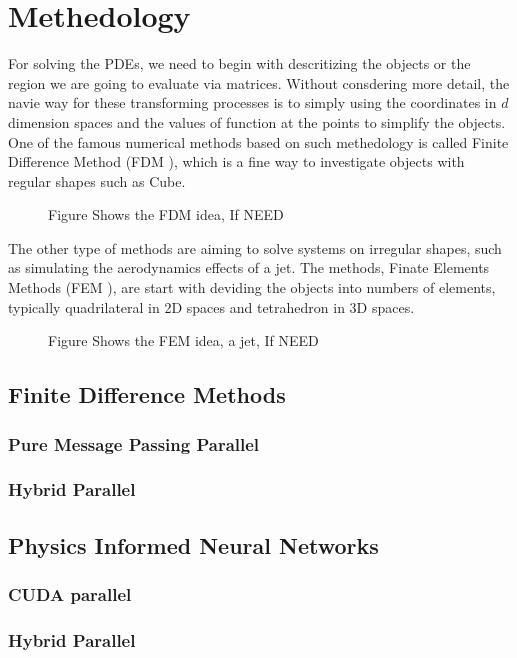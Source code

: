 \section{Methedology}
For solving the PDEs, we need to begin with descritizing the objects or the region we are going to 
evaluate via matrices. 
Without consdering more detail, the navie way for these transforming processes is to simply using 
the coordinates in $d$ dimension spaces and the values of function at the points to simplify the 
objects. 
One of the famous numerical methods based on such methedology is called Finite Difference 
Method (FDM \cite{FDM}), which is a fine way to investigate objects with regular shapes such as Cube.

\begin{figure}[htbp]
  \centering
  
  \caption{Figure Shows the FDM idea, If NEED}
  \label{<label>}
\end{figure}

The other type of methods are aiming to solve systems on irregular shapes, such as simulating the 
aerodynamics effects of a jet. 
The methods, Finate Elements Methods (FEM \cite{FEM}), are start with deviding the objects into 
numbers of elements, typically quadrilateral in 2D spaces and tetrahedron in 3D spaces.

\begin{figure}[htbp]
  \centering
  
  \caption{Figure Shows the FEM idea, a jet, If NEED}
  \label{<label>}
\end{figure}




\subsection{Finite Difference Methods}
\subsubsection{Pure Message Passing Parallel}
\subsubsection{Hybrid Parallel}


\subsection{Physics Informed Neural Networks}
\subsubsection{CUDA parallel}
\subsubsection{Hybrid Parallel}